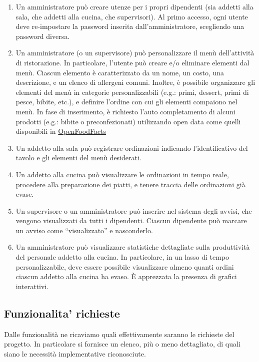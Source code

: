\begin{enumerate}
	\item Un amministratore può creare utenze per i propri dipendenti (sia addetti alla sala, che addetti
alla cucina, che supervisori). Al primo accesso, ogni utente deve re-impostare la password
inserita dall’amministratore, scegliendo una password diversa. 
	\item Un amministratore (o un supervisore) può personalizzare il menù dell’attività di ristorazione. In
particolare, l’utente può creare e/o eliminare elementi dal menù. Ciascun elemento è
caratterizzato da un nome, un costo, una descrizione, e un elenco di allergeni comuni. Inoltre,
è possibile organizzare gli elementi del menù in categorie personalizzabili (e.g.: primi, dessert,
primi di pesce, bibite, etc.), e definire l’ordine con cui gli elementi compaiono nel menù. In fase
di inserimento, è richiesto l’auto completamento di alcuni prodotti (e.g.: bibite o preconfezionati)
utilizzando open data come quelli disponibili in \href{https://it.openfoodfacts.org}{OpenFoodFacts}
	\item Un addetto alla sala può registrare ordinazioni indicando l’identificativo del tavolo e gli elementi del menù desiderati.
	\item Un addetto alla cucina può visualizzare le ordinazioni in tempo reale, procedere alla
preparazione dei piatti, e tenere traccia delle ordinazioni già evase.
	\item Un supervisore o un amministratore può inserire nel sistema degli avvisi, che vengono
visualizzati da tutti i dipendenti. Ciascun dipendente può marcare un avviso come “visualizzato” e nasconderlo.
	\item Un amministratore può visualizzare statistiche dettagliate sulla produttività del personale
addetto alla cucina. In particolare, in un lasso di tempo personalizzabile, deve essere possibile
visualizzare almeno quanti ordini ciascun addetto alla cucina ha evaso. È apprezzata la presenza
di grafici interattivi.
\end{enumerate}

\pagebreak
\subsection{Funzionalita' richieste}
Dalle funzionalità  ne ricaviamo quali effettivamente saranno le richieste del progetto. In particolare si fornisce un elenco, più o meno dettagliato, di quali siano le necessità implementative riconosciute.

